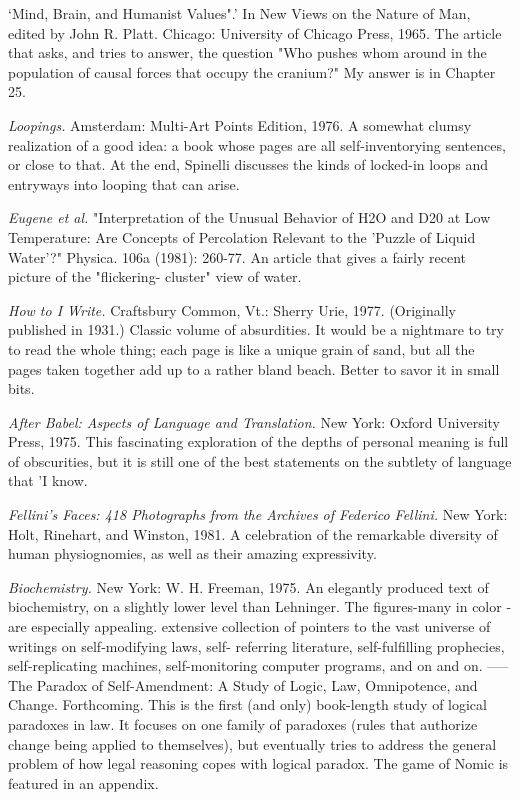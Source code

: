  `Mind, Brain, and Humanist Values".' In New Views on the Nature of Man, edited by John R. Platt. Chicago: University of Chicago Press, 1965. The article that asks, and tries to answer, the question "Who pushes whom around in the population of causal forces that occupy the cranium?" My answer is in Chapter 25.

 {\sl Loopings.} Amsterdam: Multi-Art Points Edition, 1976. A somewhat clumsy realization of a good idea: a book whose pages are all self-inventorying sentences, or close to that. At the end, Spinelli discusses the kinds of locked-in loops and entryways into looping that can arise.

 {\sl Eugene et al.} "Interpretation of the Unusual Behavior of H2O and D20 at Low Temperature: Are Concepts of Percolation Relevant to the 'Puzzle of Liquid Water'?" Physica. 106a (1981): 260-77. An article that gives a fairly recent picture of the "flickering- cluster" view of water.

 {\sl How to I Write.} Craftsbury Common, Vt.: Sherry Urie, 1977. (Originally published in 1931.) Classic volume of absurdities. It would be a nightmare to try to read the whole thing; each page is like a unique grain of sand, but all the pages taken together add up to a rather bland beach. Better to savor it in small bits.

 {\sl After Babel: Aspects of Language and Translation.} New York: Oxford University Press, 1975. This fascinating exploration of the depths of personal meaning is full of obscurities, but it is still one of the best statements on the subtlety of language that 'I know.

 {\sl Fellini's Faces: 418 Photographs from the Archives of Federico Fellini.} New York: Holt, Rinehart, and Winston, 1981. A celebration of the remarkable diversity of human physiognomies, as well as their amazing expressivity.

 {\sl Biochemistry.} New York: W. H. Freeman, 1975. An elegantly produced text of biochemistry, on a slightly lower level than Lehninger. The figures-many in color -are especially appealing. extensive collection of pointers to the vast universe of writings on self-modifying laws, self- referring literature, self-fulfilling prophecies, self-replicating machines, self-monitoring computer programs, and on and on. -----The Paradox of Self-Amendment: A Study of Logic, Law, Omnipotence, and Change. Forthcoming. This is the first (and only) book-length study of logical paradoxes in law. It focuses on one family of paradoxes (rules that authorize change being applied to themselves), but eventually tries to address the general problem of how legal reasoning copes with logical paradox. The game of Nomic is featured in an appendix.

